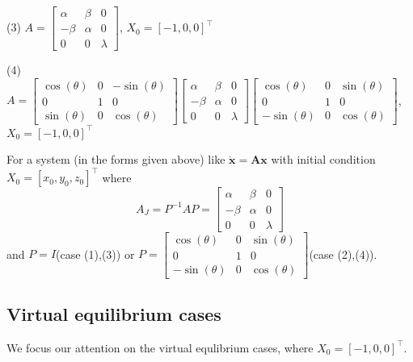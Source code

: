 \documentclass[a4paper,10pt]{article}
\begin{document}
\begin{enumerate}
		(3) $A = \begin{bmatrix}
		\alpha & \beta & 0\\
		- \beta & \alpha & 0\\
		0 & 0 & \lambda
		\end{bmatrix}$, $X_0=[-1,0,0]^{\top}$
		
		(4) $A =\begin{bmatrix}
		\cos(\theta) & 0 & -\sin(\theta)\\
		0& 1& 0\\
		\sin(\theta) & 0 & \cos(\theta)
		\end{bmatrix} 
		\begin{bmatrix}
		\alpha & \beta & 0\\
		- \beta & \alpha & 0\\
		0 & 0 & \lambda
		\end{bmatrix}
		\begin{bmatrix}
		\cos(\theta) & 0 & \sin(\theta)\\
		0& 1& 0\\
		-\sin(\theta) & 0 & \cos(\theta)
		\end{bmatrix} $, $X_0=[-1,0,0]^{\top}$
		
		
		
	\end{enumerate}
	For a system (in the forms given above) like $\dot{\mathbf																																														 {x}} =  \mathbf{A} \mathbf{x}$ with initial condition $X_0 = [x_0,y_0,z_0]^{\top}$ where 
	$$A_J={P}^{-1} A P= \begin{bmatrix}
	\alpha & \beta & 0\\
	- \beta & \alpha & 0\\
	0 & 0 & \lambda
	\end{bmatrix}
	$$  and $P = I$(case (1),(3))  or $P = \begin{bmatrix}
	\cos(\theta) & 0 & \sin(\theta)\\
	0& 1& 0\\
	-\sin(\theta) & 0 & \cos(\theta)
	\end{bmatrix}$(case (2),(4)).
	\subsection{Virtual equilibrium cases}
	We focus our attention on the virtual equlibrium cases, where $X_0=[-1,0,0]^{\top}$.
	
\end{document}
